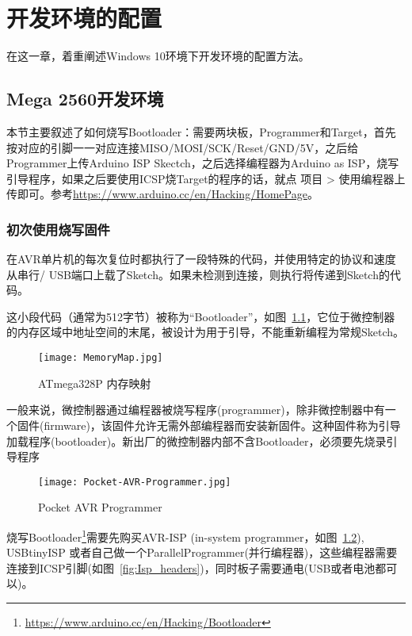 \chapter{开发环境的配置}
\label{cha:Environment}

在这一章，着重阐述Windows 10环境下开发环境的配置方法。

\section{Mega 2560开发环境}

本节主要叙述了如何烧写Bootloader：需要两块板，Programmer和Target，首先按对应的引脚一一对应连接MISO/MOSI/SCK/Reset/GND/5V，之后给Programmer上传Arduino ISP Skectch，之后选择编程器为Arduino as ISP，烧写引导程序，如果之后要使用ICSP烧Target的程序的话，就点 项目 > 使用编程器上传即可。参考\url{https://www.arduino.cc/en/Hacking/HomePage}。

\subsection{初次使用烧写固件}

在AVR单片机的每次复位时都执行了一段特殊的代码，并使用特定的协议和速度从串行/ USB端口上载了Sketch。如果未检测到连接，则执行将传递到Sketch的代码。

这小段代码（通常为512字节）被称为“Bootloader”，如图~\ref{fig:MemoryMap}，它位于微控制器的内存区域中地址空间的末尾，被设计为用于引导，不能重新编程为常规Sketch。

\begin{figure}[htbp]
    \centering
    \texttt{[image: MemoryMap.jpg]}
    \caption{ATmega328P 内存映射}
    \label{fig:MemoryMap}
\end{figure}

一般来说，微控制器通过编程器被烧写程序(programmer)，除非微控制器中有一个固件(firmware)，该固件允许无需外部编程器而安装新固件。这种固件称为引导加载程序(bootloader)。新出厂的微控制器内部不含Bootloader，必须要先烧录引导程序

\begin{figure}[htbp]
    \centering
    \texttt{[image: Pocket-AVR-Programmer.jpg]}
    \caption{Pocket AVR Programmer}
    \label{fig:Pocket-AVR-Programmer}
\end{figure}

烧写Bootloader\footnote{\url{https://www.arduino.cc/en/Hacking/Bootloader}}需要先购买AVR-ISP (in-system programmer，如图~\ref{fig:Pocket-AVR-Programmer}), USBtinyISP 或者自己做一个ParallelProgrammer(并行编程器)，这些编程器需要连接到ICSP引脚(如图~\ref{fig:Isp_headers})，同时板子需要通电(USB或者电池都可以)。

